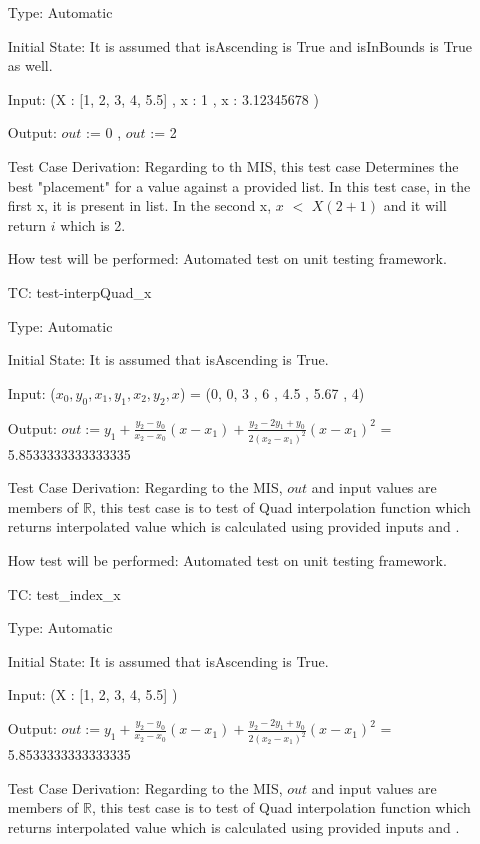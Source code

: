 \documentclass[12pt]{article}
\newcounter{utestnum} %
\begin{document}
\begin{enumerate}[label=TC\arabic*:,ref={\arabic*}]
	Type: Automatic
	
	Initial State: It is assumed that isAscending is True and isInBounds is True as well.
	
	Input: (X : [1, 2, 3, 4, 5.5] , x : 1 , x : 3.12345678 )
	
	Output: $out$ := 0 , $out$ := 2
	
	Test Case Derivation: Regarding to th MIS, this test case Determines the best "placement" for a value against a provided list. In this test case, in the first x, it is present in list. In the second x, $x$ $<$ $X(2+1)$ and it will return $i$ which is 2.
	
	How test will be performed: Automated test on unit testing framework.
	
		
		\item [TC\refstepcounter{utestnum}\theutestnum: \label{interpQuadTest}] 
	test-interpQuad\_x
	
	Type: Automatic
	
	Initial State: It is assumed that isAscending is True.
	
	Input: ($x_0, y_0, x_1, y_1, x_2, y_2, x$) = (0, 0, 3 , 6 , 4.5 , 5.67 , 4)
	
	Output: $out := y_1 + \frac{y_2 - y_0}{x_2-x_0} (x - x_1) + \frac{y_2 - 2 y_1 + y_0}{2
		(x_2-x_1)^2} (x - x_1)^2$ = 5.8533333333333335
	
	Test Case Derivation: Regarding to the MIS, $out$ and input values are members of $\mathbb{R}$, this test case is to test of Quad interpolation function which returns interpolated value which is calculated using provided inputs and .
	
	How test will be performed: Automated test on unit testing framework.
	
	\item [TC\refstepcounter{utestnum}\theutestnum: \label{indexTest}] 
	test\_index\_x
	
	Type: Automatic
	
	Initial State: It is assumed that isAscending is True.
	
	Input: (X : [1, 2, 3, 4, 5.5] )
	
	Output: $out := y_1 + \frac{y_2 - y_0}{x_2-x_0} (x - x_1) + \frac{y_2 - 2 y_1 + y_0}{2
		(x_2-x_1)^2} (x - x_1)^2$ = 5.8533333333333335
	
	Test Case Derivation: Regarding to the MIS, $out$ and input values are members of $\mathbb{R}$, this test case is to test of Quad interpolation function which returns interpolated value which is calculated using provided inputs and .
	

\end{enumerate}
\end{document}
